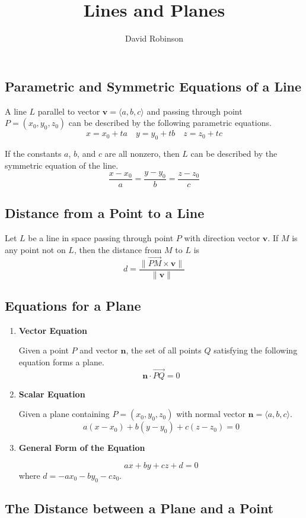 \documentclass{article}
\title{Lines and Planes}
\author{David Robinson}
\date{}
\begin{document}
\maketitle

\subsection*{Parametric and Symmetric Equations of a Line}

A line $L$ parallel to vector $\mathbf{v}=\langle a, b, c\rangle$ and passing through point $P = (x_0, y_0, z_0)$ can be described by the following parametric equations.
\[x = x_0 + ta\quad y=y_0 + tb\quad z=z_0 + tc\]

If the constants $a$, $b$, and $c$ are all nonzero, then $L$ can be described by the symmetric equation of the line.
\[\frac{x-x_0}{a}=\frac{y-y_0}{b}=\frac{z-z_0}{c}\]

\subsection*{Distance from a Point to a Line}
Let $L$ be a line in space passing through point $P$ with direction vector $\mathbf{v}$. If $M$ is any point not on $L$, then the distance from $M$ to $L$ is
\[d=\frac{\|\overrightarrow{PM}\times\mathbf{v}\|}{\|\mathbf{v}\|}\]

\subsection*{Equations for a Plane}
\begin{enumerate}
    \item \textbf{Vector Equation}
    
    Given a point $P$ and vector $\mathbf{n}$, the set of all points $Q$ satisfying the following equation forms a plane.
    \[\mathbf{n}\cdot\overrightarrow{PQ}=0\]

    \item \textbf{Scalar Equation}

    Given a plane containing $P=(x_0, y_0, z_0)$ with normal vector $\mathbf{n}=\langle a, b, c\rangle$.
    \[a(x-x_0) + b(y-y_0) + c(z-z_0) = 0\]

    \item \textbf{General Form of the Equation}
    
    \[ax+by+cz+d=0\] where $d=-ax_0 - by_0 - cz_0$.
\end{enumerate}

\subsection*{The Distance between a Plane and a Point}
\end{document}
